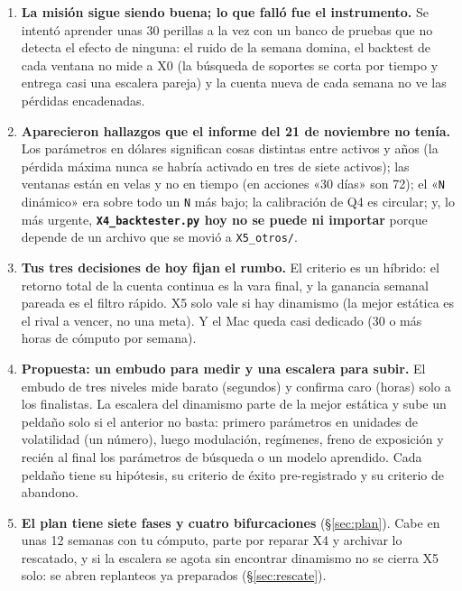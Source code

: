 \documentclass[11pt,a4paper]{article}
\newcommand{\code}[1]{\texttt{\small #1}}
\begin{document}
\begin{enumerate}[leftmargin=1.4em]
  \item \textbf{La misión sigue siendo buena; lo que falló fue el instrumento.} Se intentó aprender unas
        30 perillas a la vez con un banco de pruebas que no detecta el efecto de ninguna: el ruido de la
        semana domina, el backtest de cada ventana no mide a X0 (la búsqueda de soportes se corta por
        tiempo y entrega casi una escalera pareja) y la cuenta nueva de cada semana no ve las pérdidas
        encadenadas.
  \item \textbf{Aparecieron hallazgos que el informe del 21 de noviembre no tenía.} Los parámetros en
        dólares significan cosas distintas entre activos y años (la pérdida máxima nunca se habría activado
        en tres de siete activos); las ventanas están en velas y no en tiempo (en acciones «30 días» son 72);
        el «\code{N} dinámico» era sobre todo un \code{N} más bajo; la calibración de Q4 es circular;
        y, lo más urgente, \textbf{\code{X4\_backtester.py} hoy no se puede ni importar} porque depende de un
        archivo que se movió a \code{X5\_otros/}.
  \item \textbf{Tus tres decisiones de hoy fijan el rumbo.} El criterio es un híbrido: el retorno total
        de la cuenta continua es la vara final, y la ganancia semanal pareada es el filtro rápido. X5 solo
        vale si hay dinamismo (la mejor estática es el rival a vencer, no una meta). Y el Mac queda casi
        dedicado (30 o más horas de cómputo por semana).
  \item \textbf{Propuesta: un embudo para medir y una escalera para subir.} El embudo de tres niveles
        mide barato (segundos) y confirma caro (horas) solo a los finalistas. La escalera del dinamismo
        parte de la mejor estática y sube un peldaño solo si el anterior no basta: primero parámetros en
        unidades de volatilidad (un número), luego modulación, regímenes, freno de exposición y recién al
        final los parámetros de búsqueda o un modelo aprendido. Cada peldaño tiene su hipótesis, su
        criterio de éxito pre-registrado y su criterio de abandono.
  \item \textbf{El plan tiene siete fases y cuatro bifurcaciones} (§\ref{sec:plan}). Cabe en unas 12
        semanas con tu cómputo, parte por reparar X4 y archivar lo rescatado, y si la escalera se agota sin
        encontrar dinamismo no se cierra X5 solo: se abren replanteos ya preparados (§\ref{sec:rescate}).
\end{enumerate}
\end{document}
